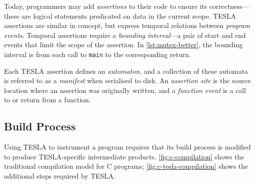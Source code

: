 Today, programmers may add \emph{assertions} to their code to ensure its
correctness---these are logical statements predicated on data in the current
scope. TESLA assertions are similar in concept, but express temporal relations
between \emph{program events}. Temporal assertions require a \emph{bounding
interval}---a pair of start and end events that limit the scope of the
assertion. In \autoref{lst:mutex-better}, the bounding interval is from each
call to \texttt{main} to the corresponding return.

Each TESLA assertion defines an \emph{automaton}, and a collection of
these automata is referred to as a \emph{manifest} when serialised to
disk. An \emph{assertion site} is the source location where an assertion
was originally written, and a \emph{function event} is a call to or
return from a function.

\subsection{Build Process} \label{sec:build-tesla}

Using TESLA to instrument a program requires that its build process is modified
to produce TESLA-specific intermediate products. \autoref{fig:c-compilation}
shows the traditional compilation model for C programs;
\autoref{fig:c-tesla-compilation} shows the additional steps required by TESLA.

